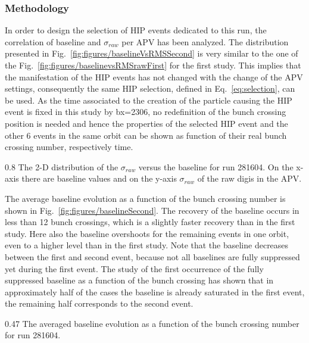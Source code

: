 \subsubsection{Methodology}

In order to design the selection of HIP events dedicated to this run, the correlation of baseline and $\sigma_{raw}$ per APV has been analyzed. The distribution presented in Fig.~\ref{fig:figures/baselineVsRMSSecond} is very similar to the one of the Fig.~\ref{fig:figures/baselinevsRMSrawFirst} for the first study. This implies that the manifestation of the HIP events has not changed with the change of the APV settings, consequently the same HIP selection, defined in Eq.~\ref{eq:selection}, can be used. As the time associated to the creation of the particle causing the HIP event is fixed in this study by bx=2306, no redefinition of the bunch crossing position is needed and hence the properties of the selected HIP event and the other 6 events in the same orbit can be shown as function of their real bunch crossing number, respectively time.

                 {0.8}       %
                 {The 2-D distribution of the $\sigma_{raw}$ versus the baseline for run 281604. On the x-axis there are baseline values and on the y-axis $\sigma_{raw}$ of the raw digis in the APV. } %


The average baseline evolution as a function of the bunch crossing number is shown in Fig.~\ref{fig:figures/baselineSecond}. The recovery of the baseline occurs in less than 12 bunch crossings, which is a slightly faster recovery than in the first study. Here also the baseline overshoots for the remaining events in one orbit, even to a higher level than in the first study. Note that the baseline decreases between the first and second event, because not all baselines are fully suppressed yet during the first event. The study of the first occurrence of the fully suppressed baseline as a function of the bunch crossing has shown that in approximately half of the cases the baseline is already saturated in the first event, the remaining half corresponds to the second event.

                 {0.47}       %
                 {The averaged baseline evolution as a function of the bunch crossing number for run 281604. } %
 

